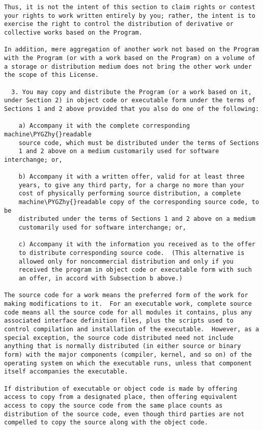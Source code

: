 \documentclass[letterpaper,10pt,english]{sphinxmanual}
\def\PYGZhy{\char`\-}
\begin{document}
\begin{Verbatim}[commandchars=\\\{\}]
Thus, it is not the intent of this section to claim rights or contest
your rights to work written entirely by you; rather, the intent is to
exercise the right to control the distribution of derivative or
collective works based on the Program.

In addition, mere aggregation of another work not based on the Program
with the Program (or with a work based on the Program) on a volume of
a storage or distribution medium does not bring the other work under
the scope of this License.

  3. You may copy and distribute the Program (or a work based on it,
under Section 2) in object code or executable form under the terms of
Sections 1 and 2 above provided that you also do one of the following:

    a) Accompany it with the complete corresponding machine\PYGZhy{}readable
    source code, which must be distributed under the terms of Sections
    1 and 2 above on a medium customarily used for software interchange; or,

    b) Accompany it with a written offer, valid for at least three
    years, to give any third party, for a charge no more than your
    cost of physically performing source distribution, a complete
    machine\PYGZhy{}readable copy of the corresponding source code, to be
    distributed under the terms of Sections 1 and 2 above on a medium
    customarily used for software interchange; or,

    c) Accompany it with the information you received as to the offer
    to distribute corresponding source code.  (This alternative is
    allowed only for noncommercial distribution and only if you
    received the program in object code or executable form with such
    an offer, in accord with Subsection b above.)

The source code for a work means the preferred form of the work for
making modifications to it.  For an executable work, complete source
code means all the source code for all modules it contains, plus any
associated interface definition files, plus the scripts used to
control compilation and installation of the executable.  However, as a
special exception, the source code distributed need not include
anything that is normally distributed (in either source or binary
form) with the major components (compiler, kernel, and so on) of the
operating system on which the executable runs, unless that component
itself accompanies the executable.

If distribution of executable or object code is made by offering
access to copy from a designated place, then offering equivalent
access to copy the source code from the same place counts as
distribution of the source code, even though third parties are not
compelled to copy the source along with the object code.


\end{Verbatim}
\end{document}
